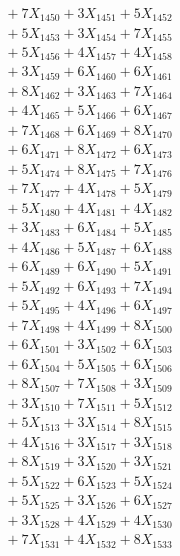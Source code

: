 \documentclass[a4paper,10pt]{article}
\begin{document}
{\begin{align}
&\;  + 7 X_{1450} + 3 X_{1451} + 5 X_{1452} \\[0.3ex]
&\;  + 5 X_{1453} + 3 X_{1454} + 7 X_{1455} \\[0.3ex]
&\;  + 5 X_{1456} + 4 X_{1457} + 4 X_{1458} \\[0.3ex]
&\;  + 3 X_{1459} + 6 X_{1460} + 6 X_{1461} \\[0.3ex]
&\;  + 8 X_{1462} + 3 X_{1463} + 7 X_{1464} \\[0.3ex]
&\;  + 4 X_{1465} + 5 X_{1466} + 6 X_{1467} \\[0.3ex]
&\;  + 7 X_{1468} + 6 X_{1469} + 8 X_{1470} \\[0.3ex]
&\;  + 6 X_{1471} + 8 X_{1472} + 6 X_{1473} \\[0.3ex]
&\;  + 5 X_{1474} + 8 X_{1475} + 7 X_{1476} \\[0.3ex]
&\;  + 7 X_{1477} + 4 X_{1478} + 5 X_{1479} \\[0.5ex]\allowbreak
&\;  + 5 X_{1480} + 4 X_{1481} + 4 X_{1482} \\[0.3ex]
&\;  + 3 X_{1483} + 6 X_{1484} + 5 X_{1485} \\[0.3ex]
&\;  + 4 X_{1486} + 5 X_{1487} + 6 X_{1488} \\[0.3ex]
&\;  + 6 X_{1489} + 6 X_{1490} + 5 X_{1491} \\[0.3ex]
&\;  + 5 X_{1492} + 6 X_{1493} + 7 X_{1494} \\[0.3ex]
&\;  + 5 X_{1495} + 4 X_{1496} + 6 X_{1497} \\[0.3ex]
&\;  + 7 X_{1498} + 4 X_{1499} + 8 X_{1500} \\[0.3ex]
&\;  + 6 X_{1501} + 3 X_{1502} + 6 X_{1503} \\[0.3ex]
&\;  + 6 X_{1504} + 5 X_{1505} + 6 X_{1506} \\[0.3ex]
&\;  + 8 X_{1507} + 7 X_{1508} + 3 X_{1509} \\[0.5ex]\allowbreak
&\;  + 3 X_{1510} + 7 X_{1511} + 5 X_{1512} \\[0.3ex]
&\;  + 5 X_{1513} + 3 X_{1514} + 8 X_{1515} \\[0.3ex]
&\;  + 4 X_{1516} + 3 X_{1517} + 3 X_{1518} \\[0.3ex]
&\;  + 8 X_{1519} + 3 X_{1520} + 3 X_{1521} \\[0.3ex]
&\;  + 5 X_{1522} + 6 X_{1523} + 5 X_{1524} \\[0.3ex]
&\;  + 5 X_{1525} + 3 X_{1526} + 6 X_{1527} \\[0.3ex]
&\;  + 3 X_{1528} + 4 X_{1529} + 4 X_{1530} \\[0.3ex]
&\;  + 7 X_{1531} + 4 X_{1532} + 8 X_{1533} \\[0.3ex]

\end{align}}
\end{document}
